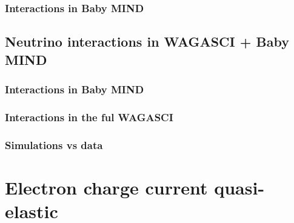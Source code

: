 \subsubsection{Interactions in Baby MIND}

\subsection{Neutrino interactions in WAGASCI + Baby MIND}

\subsubsection{Interactions in Baby MIND}

\subsubsection{Interactions in the ful WAGASCI}

\subsubsection{Simulations vs data}



\section{Electron charge current quasi-elastic}

